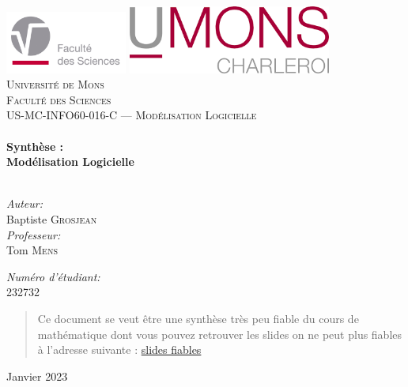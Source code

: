 \begin{titlepage}

\begin{center}
\includegraphics[width=0.3\textwidth]{./Images/Logos/fs.pdf}\hfill
\includegraphics[width=0.5\textwidth]{./Images/Logos/umons_charleroi.png}\\[0.6cm]
\textsc{\LARGE Université de Mons}\\[0.4cm]
\textsc{\LARGE Faculté des Sciences}\\[1.5cm]
\textsc{\Large US-MC-INFO60-016-C — Modélisation Logicielle}\\[0.5cm]
\HRule \\[0.4cm]
{ \huge \bfseries Synthèse :}\\[0.2cm]
{ \huge \bfseries Modélisation Logicielle}\\[0.4cm]
\HRule \\[0.4cm]
\begin{minipage}{0.4\textwidth}
\begin{flushleft} \large
\emph{Auteur:}\\
Baptiste \textsc{Grosjean}\\
\emph{Professeur:}\\
Tom \textsc{Mens}
\end{flushleft}
\end{minipage}
\begin{minipage}{0.4\textwidth}
\begin{flushright} \large
\emph{Numéro d'étudiant:} \\
232732
\end{flushright}
\end{minipage}
\renewcommand{\abstractname}{Résumé}
		\begin{abstract}
		Ce document se veut être une synthèse très peu fiable du cours de mathématique dont vous pouvez retrouver les slides on ne peut plus fiables à l'adresse suivante : \href{https://bertrand.mareschal.web.ulb.be/math-umons.html}{slides fiables}
		\end{abstract}
\vfill
{\large Janvier 2023}
\end{center}
\end{titlepage}